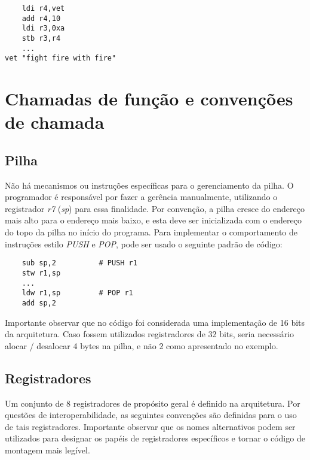 \documentclass{extreport}
\begin{document}
\begin{verbatim}
    ldi r4,vet
    add r4,10
    ldi r3,0xa
    stb r3,r4
    ...
vet "fight fire with fire"
\end{verbatim}

\section{Chamadas de função e convenções de chamada}
\label{ref:fcalls_conv}

\subsection{Pilha}
\label{ref:stack}
Não há mecanismos ou instruções específicas para o gerenciamento da pilha. O programador é responsável por fazer a gerência manualmente, utilizando o registrador \textit{r7} (\textit{sp}) para essa finalidade. Por convenção, a pilha cresce do endereço mais alto para o endereço mais baixo, e esta deve ser inicializada com o endereço do topo da pilha no início do programa. Para implementar o comportamento de instruções estilo \textit{PUSH} e \textit{POP}, pode ser usado o seguinte padrão de código:

\begin{verbatim}
    sub sp,2          # PUSH r1
    stw r1,sp
    ...
    ldw r1,sp         # POP r1
    add sp,2
\end{verbatim}

Importante observar que no código foi considerada uma implementação de 16 bits da arquitetura. Caso fossem utilizados registradores de 32 bits, seria necessário alocar / desalocar 4 bytes na pilha, e não 2 como apresentado no exemplo.

\subsection{Registradores}
\label{ref:regs}
Um conjunto de 8 registradores de propósito geral é definido na arquitetura. Por questões de interoperabilidade, as seguintes convenções são definidas para o uso de tais registradores. Importante observar que os nomes alternativos podem ser utilizados para designar os papéis de registradores específicos e tornar o código de montagem mais legível.
\end{document}
